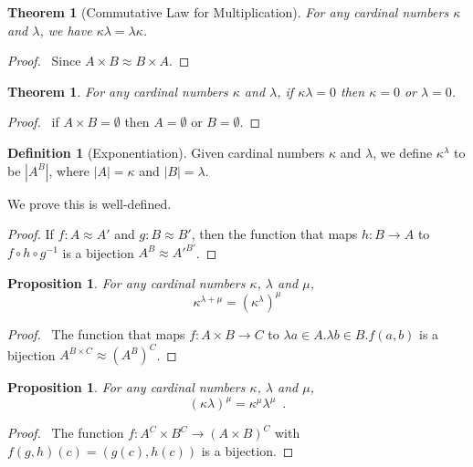 \documentclass{book}
\let\qed\relax
\newtheorem{prop}[ax]{Proposition}
\newtheorem{thm}[ax]{Theorem}
\theoremstyle{definition}
\newtheorem{df}[ax]{Definition}
\begin{document}
\begin{thm}[Commutative Law for Multiplication]
For any cardinal numbers $\kappa$ and $\lambda$, we have $\kappa \lambda = \lambda \kappa$.
\end{thm}

\begin{proof}
\pf\ Since $A \times B \approx B \times A$. \qed
\end{proof}

\begin{thm}
For any cardinal numbers $\kappa$ and $\lambda$, if $\kappa \lambda = 0$ then $\kappa = 0$ or $\lambda = 0$.
\end{thm}

\begin{proof}
\pf\ if $A \times B = \emptyset$ then $A = \emptyset$ or $B = \emptyset$. \qed
\end{proof}

\begin{df}[Exponentiation]
Given cardinal numbers $\kappa$ and $\lambda$, we define $\kappa^\lambda$ to be $|A^B|$, where $|A| = \kappa$ and $|B| = \lambda$.

We prove this is well-defined.
\end{df}

\begin{proof}
\pf
If $f : A \approx A'$ and $g : B \approx B'$, then the function that maps $h : B \rightarrow A$ to $f \circ h \circ g^{-1}$ is a bijection $A^B \approx A'^{B'}$. \qed
\end{proof}

\begin{prop}
For any cardinal numbers $\kappa$, $\lambda$ and $\mu$,
\[ \kappa^{\lambda + \mu} = (\kappa^{\lambda})^\mu \]
\end{prop}

\begin{proof}
\pf\ The function that maps $f : A \times B \rightarrow C$ to $\lambda a \in A. \lambda b \in B. f(a,b)$ is a bijection $A^{B \times C} \approx (A^B)^C$. \qed
\end{proof}

\begin{prop}
For any cardinal numbers $\kappa$, $\lambda$ and $\mu$,
\[ (\kappa \lambda)^\mu = \kappa^\mu \lambda^\mu \enspace . \]
\end{prop}

\begin{proof}
\pf\ The function $f : A^C \times B^C \rightarrow (A \times B)^C$ with $f(g,h)(c) = (g(c),h(c))$ is a bijection. \qed
\end{proof}
\end{document}
